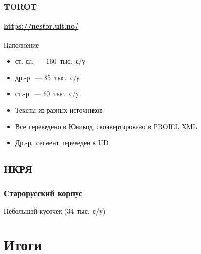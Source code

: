 \begin{frame}
  \frametitle{TOROT}
  \framesubtitle{\url{https://nestor.uit.no/}}

  \begin{block}{Наполнение}
    \begin{itemize}
      \item ст.-сл.~--- 160~тыс.\ с/у
      \item др.-р.~--- 85~тыс.\ с/у
      \item ст.-р.~--- 60~тыс.\ с/у
    \end{itemize}
  \end{block}

  \vfill

  \begin{itemize}
    \item Тексты из разных источников
    \item Все переведено в Юникод, сконвертировано в PROIEL XML
    \item Др.-р.\ сегмент переведен в UD
  \end{itemize}

\end{frame}

\subsection{НКРЯ}

\begin{frame}
  \frametitle{Старорусский корпус}

  Небольшой кусочек (34~тыс.\ с/у)

\end{frame}

\section{Итоги}
\frame{\tableofcontents[currentsection]}

